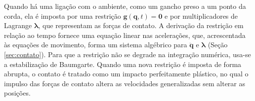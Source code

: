 Quando há uma ligação com o ambiente, como um gancho preso a um ponto da corda, ela é imposta por uma restrição $\mathbf g(\mathbf q,t)=\mathbf 0$ e por multiplicadores de Lagrange $\boldsymbol\lambda$, que representam as forças de contato. A derivação da restrição em relação ao tempo fornece uma equação linear nas acelerações, que, acrescentada às equações de movimento, forma um sistema algébrico para $\ddot{\mathbf q}$ e $\boldsymbol\lambda$ (Seção \ref{sec:contato}). Para que a restrição não se degrade na integração numérica, usa-se a estabilização de Baumgarte. Quando uma nova restrição é imposta de forma abrupta, o contato é tratado como um impacto perfeitamente plástico, no qual o impulso das forças de contato altera as velocidades generalizadas sem alterar as posições.
